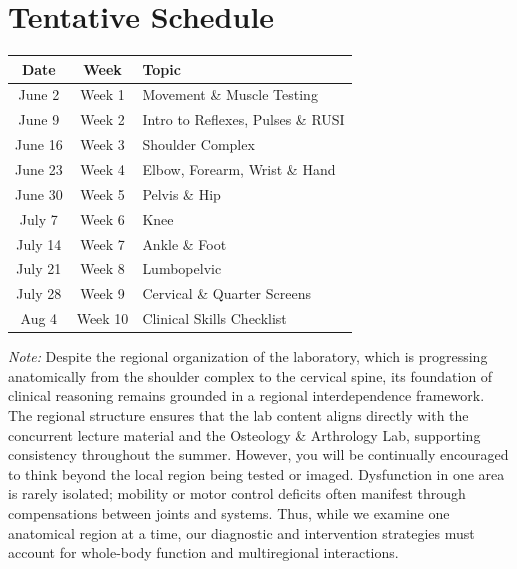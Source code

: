 \chapter*{Tentative Schedule}

\begin{center}
\begin{tabular}{|c|c|p{8cm}|}
\hline
\textbf{Date} & \textbf{Week} & \textbf{Topic} \\
\hline
June 2 & Week 1 & Movement \& Muscle Testing \\
\hline
June 9 & Week 2 & Intro to Reflexes, Pulses \& RUSI \\
\hline
June 16 & Week 3 & Shoulder Complex \\
\hline
June 23 & Week 4 & Elbow, Forearm, Wrist \& Hand \\
\hline
June 30 & Week 5 & Pelvis \& Hip \\
\hline
July 7 & Week 6 & Knee \\
\hline
July 14 & Week 7 & Ankle \& Foot \\
\hline
July 21 & Week 8 & Lumbopelvic \\
\hline
July 28 & Week 9 & Cervical \& Quarter Screens \\
\hline
Aug 4 & Week 10 & Clinical Skills Checklist \\
\hline
\end{tabular}
\end{center}

\bigskip
\noindent
\textit{Note:} Despite the regional organization of the laboratory, which is progressing anatomically from the shoulder complex to the cervical spine, its foundation of clinical reasoning remains grounded in a regional interdependence framework. The regional structure ensures that the lab content aligns directly with the concurrent lecture material and the Osteology \& Arthrology Lab, supporting consistency throughout the summer. However, you will be continually encouraged to think beyond the local region being tested or imaged. Dysfunction in one area is rarely isolated; mobility or motor control deficits often manifest through compensations between joints and systems. Thus, while we examine one anatomical region at a time, our diagnostic and intervention strategies must account for whole-body function and multiregional interactions.

